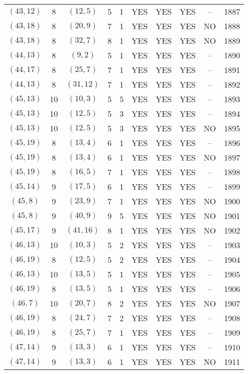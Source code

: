 \begin{longtable}{|c|c|c|c|c|c|c|c|c|c|}
$(43, 12)$ & 8 & $(12, 5)$ & 5 & 1 & YES & YES & YES & -- & 1887\\
$(43, 18)$ & 8 & $(20, 9)$ & 7 & 1 & YES & YES & YES & NO & 1888\\
$(43, 18)$ & 8 & $(32, 7)$ & 8 & 1 & YES & YES & YES & NO & 1889\\
$(44, 13)$ & 8 & $(9, 2)$ & 5 & 1 & YES & YES & YES & -- & 1890\\
$(44, 17)$ & 8 & $(25, 7)$ & 7 & 1 & YES & YES & YES & -- & 1891\\
$(44, 13)$ & 8 & $(31, 12)$ & 7 & 1 & YES & YES & YES & -- & 1892\\
$(45, 13)$ & 10 & $(10, 3)$ & 5 & 5 & YES & YES & YES & -- & 1893\\
$(45, 13)$ & 10 & $(12, 5)$ & 5 & 3 & YES & YES & YES & -- & 1894\\
$(45, 13)$ & 10 & $(12, 5)$ & 5 & 3 & YES & YES & YES & NO & 1895\\
$(45, 19)$ & 8 & $(13, 4)$ & 6 & 1 & YES & YES & YES & -- & 1896\\
$(45, 19)$ & 8 & $(13, 4)$ & 6 & 1 & YES & YES & YES & NO & 1897\\
$(45, 19)$ & 8 & $(16, 5)$ & 7 & 1 & YES & YES & YES & -- & 1898\\
$(45, 14)$ & 9 & $(17, 5)$ & 6 & 1 & YES & YES & YES & -- & 1899\\
$(45, 8)$ & 9 & $(23, 9)$ & 7 & 1 & YES & YES & YES & NO & 1900\\
$(45, 8)$ & 9 & $(40, 9)$ & 9 & 5 & YES & YES & YES & NO & 1901\\
$(45, 17)$ & 9 & $(41, 16)$ & 8 & 1 & YES & YES & YES & NO & 1902\\
$(46, 13)$ & 10 & $(10, 3)$ & 5 & 2 & YES & YES & YES & -- & 1903\\
$(46, 19)$ & 8 & $(12, 5)$ & 5 & 2 & YES & YES & YES & -- & 1904\\
$(46, 13)$ & 10 & $(13, 5)$ & 5 & 1 & YES & YES & YES & -- & 1905\\
$(46, 19)$ & 8 & $(13, 5)$ & 5 & 1 & YES & YES & YES & -- & 1906\\
$(46, 7)$ & 10 & $(20, 7)$ & 8 & 2 & YES & YES & YES & NO & 1907\\
$(46, 19)$ & 8 & $(24, 7)$ & 7 & 2 & YES & YES & YES & -- & 1908\\
$(46, 19)$ & 8 & $(25, 7)$ & 7 & 1 & YES & YES & YES & -- & 1909\\
$(47, 14)$ & 9 & $(13, 3)$ & 6 & 1 & YES & YES & YES & -- & 1910\\
$(47, 14)$ & 9 & $(13, 3)$ & 6 & 1 & YES & YES & YES & NO & 1911\\

\end{longtable}
